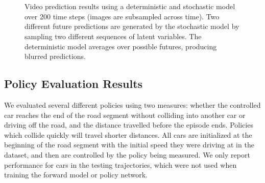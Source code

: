 \documentclass{article} %
\begin{document}
\begin{figure}[t!]
    \centering
     \\
     \\
    \caption{Video prediction results using a deterministic and stochastic model over 200 time steps (images are subsampled across time). Two different future predictions are generated by the stochastic model by sampling two different sequences of latent variables. The deterministic model averages over possible futures, producing blurred predictions.}
    \label{prediction-results}
\end{figure}









    \subsection{Policy Evaluation Results}

    We evaluated several different policies using two measures: whether the controlled car reaches the end of the road segment without colliding into another car or driving off the road, and the distance travelled before the episode ends. Policies which collide quickly will travel shorter distances. All cars are initialized at the beginning of the road segment with the initial speed they were driving at in the dataset, and then are controlled by the policy being measured. We only report performance for cars in the testing trajectories, which were not used when training the forward model or policy network. 
\end{document}
